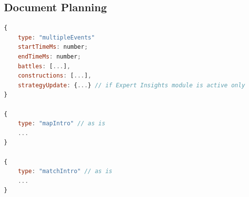 \subsection{Document Planning}
\label{sec:example-planning}
\begin{lstlisting}[language=JavaScript, caption={Document Planner output: A content unit containing grouped events.}, label={lst:planner-output}]
{
    type: "multipleEvents"
    startTimeMs: number;
    endTimeMs: number;
    battles: [...],
    constructions: [...],
    strategyUpdate: {...} // if Expert Insights module is active only
}

{
    type: "mapIntro" // as is
    ...
}

{
    type: "matchIntro" // as is
    ...
}
\end{lstlisting}


